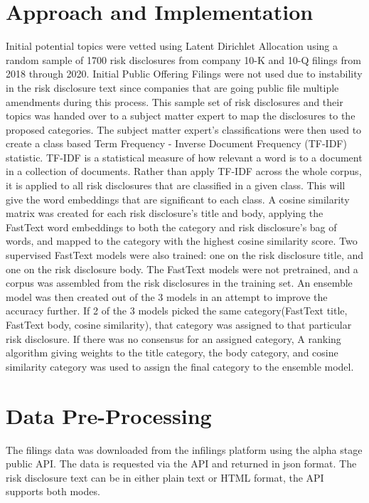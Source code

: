 \documentclass[11pt]{article}
\begin{document}
\section{Approach and Implementation}
Initial potential topics were vetted using Latent Dirichlet Allocation using a random sample of 1700 risk disclosures from company 10-K and 10-Q filings from 2018 through 2020.  Initial Public Offering Filings were not used due to instability in the risk disclosure text since companies that are going public file multiple amendments during this process.  This sample set of risk disclosures and their topics was handed over to a subject matter expert to map the disclosures to the proposed categories. The subject matter expert's classifications were then used to create a class based Term Frequency - Inverse Document Frequency (TF-IDF) statistic.  TF-IDF is a statistical measure of how relevant a word is to a document in a collection of documents.  Rather than apply TF-IDF across the whole corpus, it is applied to all risk disclosures that are classified in a given class.  This will give the word embeddings that are significant to each class.  A cosine similarity matrix was created for each risk disclosure's title and body, applying the FastText word embeddings to both the category and risk disclosure's bag of words, and mapped to the category with the highest cosine similarity score.  Two supervised FastText models were also trained: one on the risk disclosure title, and one on the risk disclosure body.  The FastText models were not pretrained, and a corpus was assembled from the risk disclosures in the training set.  An ensemble model was then created out of the 3 models in an attempt to improve the accuracy further.  If 2 of the 3 models picked the same category(FastText title, FastText body, cosine similarity), that category was assigned to that particular risk disclosure. If there was no consensus for an assigned category, A ranking algorithm giving weights to the title category, the body category, and cosine similarity category was used to assign the final category to the ensemble model.    

\section{Data Pre-Processing}

The filings data was downloaded from the infilings platform using the alpha stage public API.  The data is requested via the API and returned in json format. The risk disclosure text can be in either plain text or HTML format, the API supports both modes.
\end{document}
